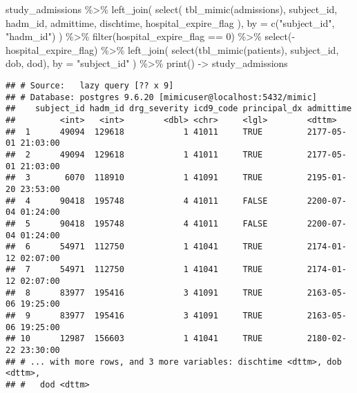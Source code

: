 \documentclass[
]{article}
\newenvironment{Shaded}{\begin{snugshade}}{\end{snugshade}}
\newcommand{\AttributeTok}[1]{\textcolor[rgb]{0.77,0.63,0.00}{#1}}
\newcommand{\DecValTok}[1]{\textcolor[rgb]{0.00,0.00,0.81}{#1}}
\newcommand{\FunctionTok}[1]{\textcolor[rgb]{0.00,0.00,0.00}{#1}}
\newcommand{\NormalTok}[1]{#1}
\newcommand{\OtherTok}[1]{\textcolor[rgb]{0.56,0.35,0.01}{#1}}
\newcommand{\SpecialCharTok}[1]{\textcolor[rgb]{0.00,0.00,0.00}{#1}}
\newcommand{\StringTok}[1]{\textcolor[rgb]{0.31,0.60,0.02}{#1}}
\begin{document}
\begin{Shaded}
\begin{Highlighting}[]
\NormalTok{study\_admissions }\SpecialCharTok{\%\textgreater{}\%}
  \FunctionTok{left\_join}\NormalTok{(}
    \FunctionTok{select}\NormalTok{(}
      \FunctionTok{tbl\_mimic}\NormalTok{(admissions),}
\NormalTok{      subject\_id, hadm\_id, admittime, dischtime, hospital\_expire\_flag}
\NormalTok{    ),}
    \AttributeTok{by =} \FunctionTok{c}\NormalTok{(}\StringTok{"subject\_id"}\NormalTok{, }\StringTok{"hadm\_id"}\NormalTok{)}
\NormalTok{  ) }\SpecialCharTok{\%\textgreater{}\%}
  \FunctionTok{filter}\NormalTok{(hospital\_expire\_flag }\SpecialCharTok{==} \DecValTok{0}\NormalTok{) }\SpecialCharTok{\%\textgreater{}\%}
  \FunctionTok{select}\NormalTok{(}\SpecialCharTok{{-}}\NormalTok{hospital\_expire\_flag) }\SpecialCharTok{\%\textgreater{}\%}
  \FunctionTok{left\_join}\NormalTok{(}
    \FunctionTok{select}\NormalTok{(}\FunctionTok{tbl\_mimic}\NormalTok{(patients), subject\_id, dob, dod),}
    \AttributeTok{by =} \StringTok{"subject\_id"}
\NormalTok{  ) }\SpecialCharTok{\%\textgreater{}\%}
  \FunctionTok{print}\NormalTok{() }\OtherTok{{-}\textgreater{}}\NormalTok{ study\_admissions}
\end{Highlighting}
\end{Shaded}

\begin{verbatim}
## # Source:   lazy query [?? x 9]
## # Database: postgres 9.6.20 [mimicuser@localhost:5432/mimic]
##    subject_id hadm_id drg_severity icd9_code principal_dx admittime          
##         <int>   <int>        <dbl> <chr>     <lgl>        <dttm>             
##  1      49094  129618            1 41011     TRUE         2177-05-01 21:03:00
##  2      49094  129618            1 41011     TRUE         2177-05-01 21:03:00
##  3       6070  118910            1 41091     TRUE         2195-01-20 23:53:00
##  4      90418  195748            4 41011     FALSE        2200-07-04 01:24:00
##  5      90418  195748            4 41011     FALSE        2200-07-04 01:24:00
##  6      54971  112750            1 41041     TRUE         2174-01-12 02:07:00
##  7      54971  112750            1 41041     TRUE         2174-01-12 02:07:00
##  8      83977  195416            3 41091     TRUE         2163-05-06 19:25:00
##  9      83977  195416            3 41091     TRUE         2163-05-06 19:25:00
## 10      12987  156603            1 41041     TRUE         2180-02-22 23:30:00
## # ... with more rows, and 3 more variables: dischtime <dttm>, dob <dttm>,
## #   dod <dttm>
\end{verbatim}
\end{document}
